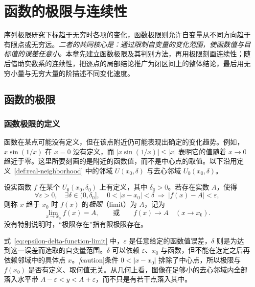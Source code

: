 \setcounter{chapter}{2} %
\chapter{函数的极限与连续性}
\label{chap:function-limits-and-continuity}

序列极限研究下标趋于无穷时各项的变化，函数极限则允许自变量从不同方向趋于有限点或无穷远。\emph{二者的共同核心是：通过限制自变量的变化范围，使函数值与目标值的误差任意小。}本章先建立函数极限及其判别方法，再用极限刻画连续性；随后借助实数系的连续性，把逐点的局部结论推广为闭区间上的整体结论，最后用无穷小量与无穷大量的阶描述不同变化速度。

\section{函数的极限}
\label{sec:function-limits}

\subsection{函数极限的定义}
\label{subsec:definition-of-function-limits}

函数在某点可能没有定义，但在该点附近仍可能表现出确定的变化趋势。例如，$x\sin(1/x)$ 在 $x=0$ 没有定义，而 $|x\sin(1/x)|\leq|x|$ 表明它的值随着 $x\to0$ 趋近于零。这里所要刻画的是附近的函数值，而不是中心点的取值。以下沿用定义~\ref{def:real-neighborhood} 中的邻域 $U(x_0,\delta)$ 与去心邻域 $U_0(x_0,\delta)$。

\begin{definition}
\label{def:finite-function-limit}
设实函数 $f$ 在某个 $U_0(x_0,\delta_0)$ 上有定义，其中 $\delta_0>0$。若存在实数 $A$，使得
\begin{equation}
    \forall\varepsilon>0,\quad\exists\delta\in(0,\delta_0],\quad
    0<|x-x_0|<\delta\ \Longrightarrow\ |f(x)-A|<\varepsilon,
    \label{eq:epsilon-delta-function-limit}
\end{equation}
则称 $x$ 趋于 $x_0$ 时 $f(x)$ 的\emph{极限}（limit）为 $A$，记为
\[
    \lim_{x\to x_0}f(x)=A,
    \qquad\text{或}\qquad f(x)\to A\quad(x\to x_0).
\]
没有特别说明时，“极限存在”指有限极限存在。
\end{definition}

式~\eqref{eq:epsilon-delta-function-limit} 中，$\varepsilon$ 是任意给定的函数值误差，$\delta$ 则是为达到这一误差而选取的自变量范围。$\delta$ 可以依赖 $\varepsilon$、$x_0$ 与函数，但不能在选定之后再依赖邻域中的具体点 $x$。\emph[caution]{条件 $0<|x-x_0|$ 排除了中心点，所以极限与 $f(x_0)$ 是否有定义、取何值无关。}从几何上看，图像在足够小的去心邻域内全部落入水平带 $A-\varepsilon<y<A+\varepsilon$，而不只是有若干点落入其中。

